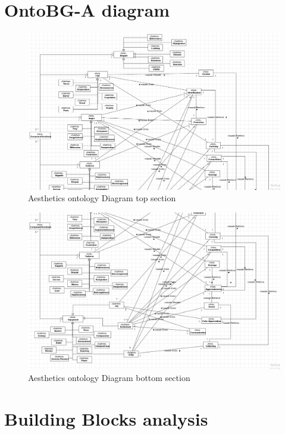 \section{OntoBG-A diagram}
\label{appendix:a5}
\begin{figure}[h!]
    \centering
    \includegraphics[scale = 0.57, angle = 90]{Images/Model/Emotion1.png}
    \caption{Aesthetics ontology Diagram top section}
    \label{fig:aestDiag1}
\end{figure}

\begin{figure}[h!]
    \centering
    \includegraphics[scale = 0.6, angle = 90]{Images/Model/Emotion2.png}
    \caption{Aesthetics ontology Diagram bottom section}
    \label{fig:aestDiag2}
\end{figure}


\section{Building Blocks analysis}
\label{appendix:a6}
